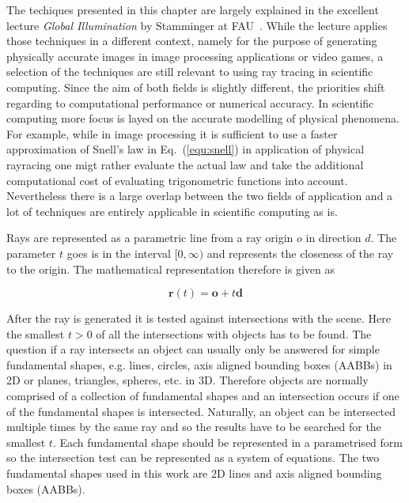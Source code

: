 \documentclass[a4paper,10pt]{article}
\renewcommand{\vec}[1]{\mathbf{#1}}
\newcommand{\equref}[1]{Eq.~(\ref{#1})}
\begin{document}
    The techiques presented in this chapter are largely explained
    in the excellent lecture \emph{Global Illumination} by 
    Stamminger at FAU~\cite{globillum}.
    While the lecture applies those techniques in a different context,
    namely for the purpose of generating physically accurate images
    in image processing applications or video games,
    a selection of the techniques are still relevant to using
    ray tracing in scientific computing.
    Since the aim of both fields is slightly different, the priorities
    shift regarding to computational performance or numerical
    accuracy.
    In scientific computing more focus is layed on the accurate modelling
    of physical phenomena.
    For example, while in image processing it is sufficient to use a
    faster approximation of Snell's law in \equref{equ:snell} in application
    of physical rayracing one migt rather evaluate the actual law and
    take the additional computational cost of evaluating trigonometric
    functions into account.
    Nevertheless there is a large overlap between the two fields of
    application and a lot of techniques are entirely applicable
    in scientific computing as is.

    Rays are represented as a parametric line from a ray origin $o$ in
    direction $d$.
    The parameter $t$ goes is in the interval $[0, \infty)$ and represents
    the closeness of the ray to the origin.
    The mathematical representation therefore is given as

    \begin{equation}
        \label{equ:ray}
        \vec{r}(t) = \vec{o} + t\vec{d}
    \end{equation}

    After the ray is generated it is tested against intersections with the
    scene.
    Here the smallest $t > 0$ of all the intersections with objects has to
    be found.
    The question if a ray intersects an object can usually only be answered
    for simple fundamental shapes, e.g. lines, circles, axis aligned bounding
    boxes (AABBs) in 2D or planes, triangles, spheres, etc. in 3D.
    Therefore objects are normally comprised of a collection of fundamental
    shapes and an intersection occurs if one of the fundamental shapes is
    intersected.
    Naturally, an object can be intersected multiple times by the same ray
    and so the results have to be searched for the smallest $t$.
    Each fundamental shape should be represented in a parametrised form 
    so the intersection test can be represented as a system of equations.
    The two fundamental shapes used in this work are 2D lines and axis
    aligned bounding boxes (AABBs).
\end{document}
